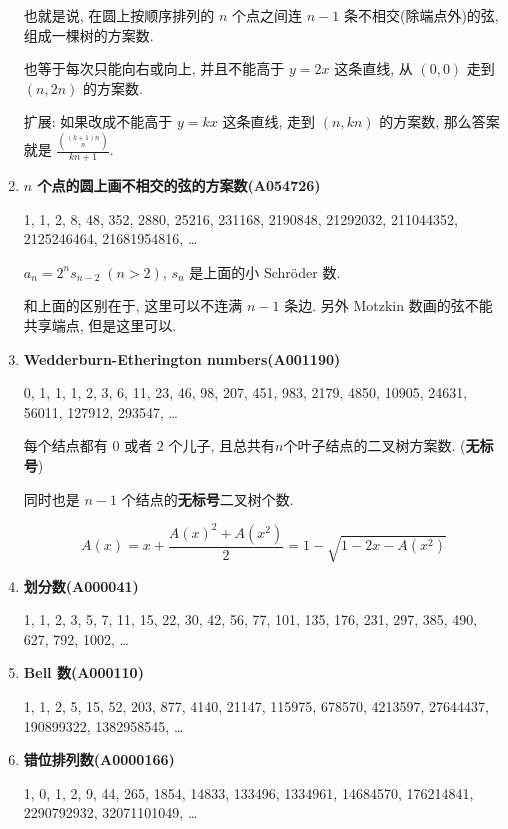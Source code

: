 \begin{enumerate}
          也就是说, 在圆上按顺序排列的 \(n\) 个点之间连 \(n - 1\) 条不相交(除端点外)的弦, 组成一棵树的方案数.
          
          也等于每次只能向右或向上, 并且不能高于 \(y = 2x\) 这条直线, 从 \((0, 0)\) 走到 \((n, 2n)\) 的方案数.
          
          扩展: 如果改成不能高于 \(y = kx\) 这条直线, 走到 \((n, kn)\) 的方案数, 那么答案就是 \( \frac {{(k + 1)n \choose n}} {kn + 1} \).
          
    \item \textbf{\(n\) 个点的圆上画不相交的弦的方案数(A054726)}
          
          1, 1, 2, 8, 48, 352, 2880, 25216, 231168, 2190848, 21292032, 211044352, 2125246464, 21681954816, \dots
          
          \( a_n = 2^n s_{n - 2} \; (n > 2) \), \(s_n\) 是上面的小 Schr\"oder 数.
          
          和上面的区别在于, 这里可以不连满 \(n-1\) 条边. 另外 Motzkin 数画的弦不能共享端点, 但是这里可以.
          
    \item \textbf{Wedderburn-Etherington numbers(A001190)}
          
          0, 1, 1, 1, 2, 3, 6, 11, 23, 46, 98, 207, 451, 983, 2179, 4850, 10905, 24631, 56011, 127912, 293547, \dots
          
          每个结点都有 \(0\) 或者 \(2\) 个儿子, 且总共有\(n\)个叶子结点的二叉树方案数. (\textbf{无标号})
          
          同时也是 \(n-1\) 个结点的\textbf{无标号}二叉树个数.
          
          \[
              A(x) = x + \frac {A(x) ^ 2 + A(x ^ 2)} 2 = 1 - \sqrt{1 - 2x - A(x ^ 2)}
          \]
          
    \item \textbf{划分数(A000041)}
          
          1, 1, 2, 3, 5, 7, 11, 15, 22, 30, 42, 56, 77, 101, 135, 176, 231, 297, 385, 490, 627, 792, 1002, \dots
          
    \item \textbf{Bell 数(A000110)}
          
          1, 1, 2, 5, 15, 52, 203, 877, 4140, 21147, 115975, 678570, 4213597, 27644437, 190899322, 1382958545, \dots
          
    \item \textbf{错位排列数(A0000166)}
          
          1, 0, 1, 2, 9, 44, 265, 1854, 14833, 133496, 1334961, 14684570, 176214841, 2290792932, 32071101049, \dots
          

\end{enumerate}
